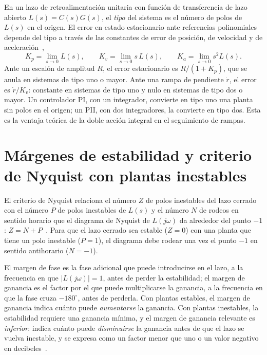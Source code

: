 En un lazo de retroalimentación unitaria con función de transferencia de lazo abierto $L(s)=C(s)G(s)$, el \emph{tipo} del sistema es el número de polos de $L(s)$ en el origen. El error en estado estacionario ante referencias polinomiales depende del tipo a través de las constantes de error de posición, de velocidad y de aceleración~\cite{ogata,gene},
\begin{equation}
K_p=\lim_{s\to0}L(s), \qquad K_v=\lim_{s\to0}s\,L(s), \qquad K_a=\lim_{s\to0}s^2L(s) .
\label{eq:constantes_error}
\end{equation}
Ante un escalón de amplitud $R$, el error estacionario es $R/(1+K_p)$, que se anula en sistemas de tipo uno o mayor. Ante una rampa de pendiente $\dot r$, el error es $\dot r/K_v$: constante en sistemas de tipo uno y nulo en sistemas de tipo dos o mayor. Un controlador PI, con un integrador, convierte en tipo uno una planta sin polos en el origen; un PII, con dos integradores, la convierte en tipo dos. Esta es la ventaja teórica de la doble acción integral en el seguimiento de rampas.

\section{Márgenes de estabilidad y criterio de Nyquist con plantas inestables}

El criterio de Nyquist relaciona el número $Z$ de polos inestables del lazo cerrado con el número $P$ de polos inestables de $L(s)$ y el número $N$ de rodeos en sentido horario que el diagrama de Nyquist de $L(j\omega)$ da alrededor del punto $-1$: $Z=N+P$~\cite{gene}. Para que el lazo cerrado sea estable ($Z=0$) con una planta que tiene un polo inestable ($P=1$), el diagrama debe rodear una vez el punto $-1$ en sentido antihorario ($N=-1$).

El margen de fase es la fase adicional que puede introducirse en el lazo, a la frecuencia en que $|L(j\omega)|=1$, antes de perder la estabilidad; el margen de ganancia es el factor por el que puede multiplicarse la ganancia, a la frecuencia en que la fase cruza $-180^\circ$, antes de perderla. Con plantas estables, el margen de ganancia indica cuánto puede \emph{aumentarse} la ganancia. Con plantas inestables, la estabilidad requiere una ganancia mínima, y el margen de ganancia relevante es \emph{inferior}: indica cuánto puede \emph{disminuirse} la ganancia antes de que el lazo se vuelva inestable, y se expresa como un factor menor que uno o un valor negativo en decibeles~\cite{gene}.

